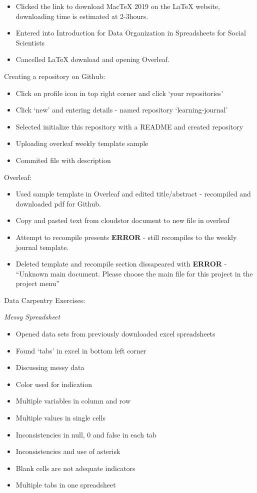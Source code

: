 \documentclass{article}
\begin{document}
\begin{itemize}
\item Clicked the link to download MacTeX 2019 on the LaTeX website, downloading time is estimated at 2-3hours. 
\item Entered into Introduction for Data Organization in Spreadsheets for Social Scientists
\item Cancelled LaTeX download and opening Overleaf. 
\end{itemize}



Creating a repository on Github:

\begin{itemize}
\item Click on profile icon in top right corner and click ‘your repositories’
\item Click ‘new’ and entering details - named repository ‘learning-journal’
\item Selected initialize this repository with a README and created repository
\item Uploading overleaf weekly template sample
\item Commited file with description
\end{itemize}
 
Overleaf:
\begin{itemize}
\item Used sample template in Overleaf and edited title/abstract - recompiled and downloaded pdf for Github.
\item Copy and pasted text from cloudstor document to new file in overleaf
\item Attempt to recompile presents \textbf{ERROR} - still recompiles to the weekly journal template. 
\item Deleted template and recompile section dissapeared with \textbf{ERROR} - “Unknown main document. Please choose the main file for this project in the project menu”
\end{itemize}

Data Carpentry Exercises:

\textit{Messy Spreadsheet}

\begin{itemize}
\item Opened data sets from previously downloaded excel spreadsheets
\item Found ‘tabs’ in excel in bottom left corner
\item Discussing messy data
\item Color used for indication
\item Multiple variables in column and row
\item Multiple values in single cells
\item Inconsistencies in null, 0 and false in each tab
\item Inconsistencies and use of asterisk
\item Blank cells are not adequate indicators
\item Multiple tabs in one spreadsheet
\end{itemize}
\end{document}
